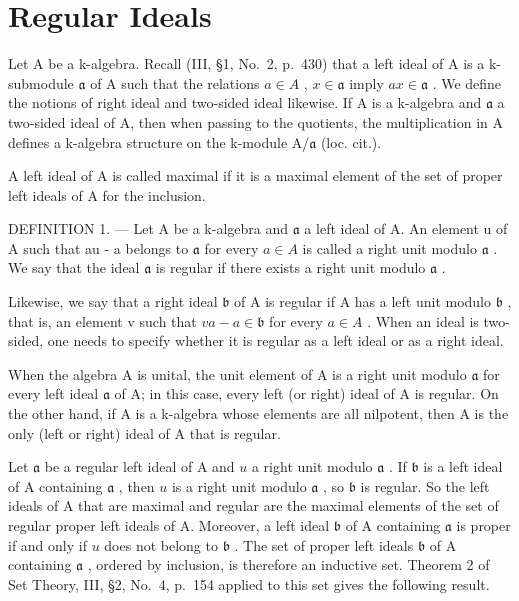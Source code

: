 \section{Regular Ideals}

Let A be a k-algebra. Recall (III, §1, No.~2, p.~430) that a left ideal of A is a k-submodule \(\mathfrak{a}\) of A such that the relations \(a \in A\) , \(x \in \mathfrak{a}\) imply \(ax \in \mathfrak{a}\) . We define the notions of right ideal and two-sided ideal likewise. If A is a k-algebra and \(\mathfrak{a}\) a two-sided ideal of A, then when passing to the quotients, the multiplication in A defines a k-algebra structure on the k-module A/\(\mathfrak{a}\) (loc. cit.).

A left ideal of A is called maximal if it is a maximal element of the set of proper left ideals of A for the inclusion.

DEFINITION 1. --- Let A be a k-algebra and \(\mathfrak{a}\) a left ideal of A. An element u of A such that au - a belongs to \(\mathfrak{a}\) for every \(a \in A\) is called a right unit modulo \(\mathfrak{a}\) . We say that the ideal \(\mathfrak{a}\) is regular if there exists a right unit modulo \(\mathfrak{a}\) .

Likewise, we say that a right ideal \(\mathfrak{b}\) of A is regular if A has a left unit modulo \(\mathfrak{b}\) , that is, an element v such that \(va - a \in \mathfrak{b}\) for every \(a \in A\) . When an ideal is two-sided, one needs to specify whether it is regular as a left ideal or as a right ideal.

When the algebra A is unital, the unit element of A is a right unit modulo \(\mathfrak{a}\) for every left ideal \(\mathfrak{a}\) of A; in this case, every left (or right) ideal of A is regular. On the other hand, if A is a k-algebra whose elements are all nilpotent, then A is the only (left or right) ideal of A that is regular.

Let \(\mathfrak{a}\) be a regular left ideal of A and \(u\) a right unit modulo \(\mathfrak{a}\) . If \(\mathfrak{b}\) is a left ideal of A containing \(\mathfrak{a}\) , then \(u\) is a right unit modulo \(\mathfrak{a}\) , so \(\mathfrak{b}\) is regular. So the left ideals of A that are maximal and regular are the maximal elements of the set of regular proper left ideals of A. Moreover, a left ideal \(\mathfrak{b}\) of A containing \(\mathfrak{a}\) is proper if and only if \(u\) does not belong to \(\mathfrak{b}\) . The set of proper left ideals \(\mathfrak{b}\) of A containing \(\mathfrak{a}\) , ordered by inclusion, is therefore an inductive set. Theorem 2 of Set Theory, III, §2, No.~4, p.~154 applied to this set gives the following result.

